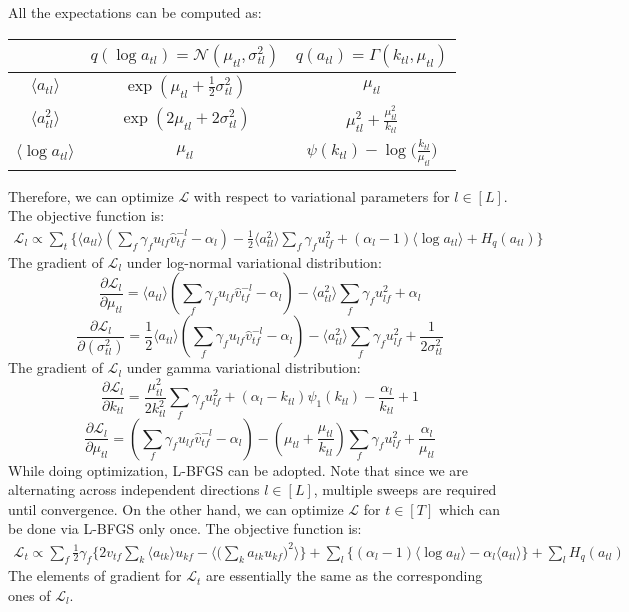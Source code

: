 \documentclass{article}
\begin{document}
All the expectations can be computed as:
\begin{center}
\begin{tabular} { c || c | c }
& $q(\log a_{tl}) = \mathcal{N}(\mu_{tl}, \sigma_{tl}^2)$ & $q(a_{tl}) = \Gamma(k_{tl}, \mu_{tl})$ \\ \hline
$\langle a_{tl} \rangle$  & $\exp(\mu_{tl} + \frac{1}{2} \sigma_{tl}^2)$ & $\mu_{tl}$ \\ \hline
$\langle a_{tl}^2 \rangle$ & $\exp(2\mu_{tl} + 2\sigma_{tl}^2)$ & $\mu_{tl}^2 + \frac{\mu_{tl}^2}{k_{tl}}$\\ \hline
$\langle \log a_{tl} \rangle$ & $\mu_{tl}$ & $\psi(k_{tl}) - \log \biggl( \frac{k_{tl}}{\mu_{tl}} \biggl)$ \\
\end{tabular}
\end{center}

Therefore, we can optimize $\mathcal{L}$ with respect to variational parameters for $l\in [L]$. The objective function is:
\begin{align*}
\mathcal{L}_l
\propto \sum_t \biggl\{ \langle a_{tl} \rangle (\sum_f \gamma_f u_{lf} \hat{v}_{tf}^{-l} -\alpha_l) - \frac{1}{2} \langle a_{tl}^2 \rangle \sum_f \gamma_f u_{lf}^2
+ (\alpha_l - 1) \langle \log a_{tl} \rangle  + H_q(a_{tl}) \biggl\} 
\end{align*}
The gradient of $\mathcal{L}_l$ under log-normal variational distribution: 
\[
\frac{\partial \mathcal{L}_l}{\partial \mu_{tl}} = \langle a_{tl} \rangle (\sum_f \gamma_f u_{lf} \hat{v}_{tf}^{-l} - \alpha_l) - \langle a_{tl}^2 \rangle \sum_f \gamma_f u_{lf}^2  + \alpha_l  
\]
\[
\frac{\partial \mathcal{L}_l}{\partial (\sigma^2_{tl})} = \frac{1}{2} \langle a_{tl} \rangle  (\sum_f \gamma_f u_{lf} \hat{v}_{tf}^{-l} - \alpha_l) - \langle a_{tl}^2 \rangle \sum_f \gamma_f  u_{lf}^2 + \frac{1}{2\sigma_{tl}^2}
\]
The gradient of $\mathcal{L}_l$ under gamma variational distribution: 
\[
\frac{\partial \mathcal{L}_l}{\partial k_{tl}} = \frac{\mu_{tl}^2}{2 k^2_{tl}}  \sum_f \gamma_f  u_{lf}^2 + (\alpha_l - k_{tl}) \psi_1(k_{tl}) - \frac{\alpha_l}{k_{tl}} + 1
\]
\[
\frac{\partial \mathcal{L}_l}{\partial \mu_{tl}} =  (\sum_f \gamma_f u_{lf} \hat{v}_{tf}^{-l} - \alpha_l) - (\mu_{tl} + \frac{\mu_{tl}}{k_{tl}})\sum_f \gamma_f u_{lf}^2 + \frac{\alpha_l}{\mu_{tl}}
\]
While doing optimization, L-BFGS can be adopted. Note that since we are alternating across independent directions $l \in [L]$, multiple sweeps are required until convergence. On the other hand, we can optimize $\mathcal{L}$ for $t \in [T]$ which can be done via L-BFGS only once. The objective function is:
\begin{align*}
\mathcal{L}_t 
\propto  \sum_f \frac{1}{2} \gamma_f \biggl\{ 2 v_{tf} \sum_k \langle a_{tk} \rangle u_{kf} -  \langle \big(\sum_k a_{tk} u_{kf}\big)^2 \rangle \biggl\}
+ \sum_l \biggl\{(\alpha_l - 1) \langle \log a_{tl} \rangle  - \alpha_l \langle a_{tl} \rangle \biggl\} + \sum_l H_q (a_{tl})
\end{align*}
The elements of gradient for $\mathcal{L}_t$ are essentially the same as the corresponding ones of $\mathcal{L}_l$.
\end{document}

